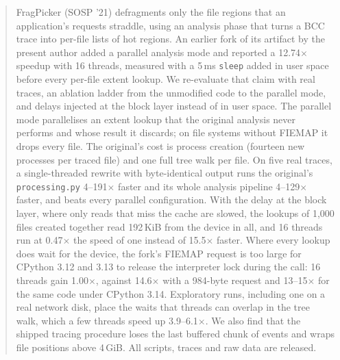\begin{abstract}
FragPicker (SOSP '21) defragments only the file regions that an application's requests
straddle, using an analysis phase that turns a BCC trace into per-file lists of hot
regions. An earlier fork of its artifact by the present author added a parallel
analysis mode and reported a 12.74$\times$ speedup with 16 threads, measured with a
5\,ms \texttt{sleep} added in user space before every per-file extent lookup. We
re-evaluate that claim with real traces, an ablation ladder from the unmodified code to
the parallel mode, and delays injected at the block layer instead of in user space.
The parallel mode parallelises an extent lookup that the original analysis never
performs and whose result it discards; on file systems without FIEMAP it drops every
file. The original's cost is process creation (fourteen new processes per traced file)
and one full tree walk per file. On five real traces, a single-threaded rewrite with
byte-identical output runs the original's \texttt{processing.py} 4--191$\times$ faster
and its whole analysis pipeline 4--129$\times$ faster, and beats every parallel
configuration. With the delay at the block layer, where only reads that miss
the cache are slowed, the lookups of 1{,}000 files created together read 192\,KiB from
the device in all, and 16 threads run at 0.47$\times$ the speed of one instead of
15.5$\times$ faster. Where every lookup does wait for the device, the fork's FIEMAP
request is too large for CPython 3.12 and 3.13 to release the interpreter lock during
the call: 16 threads gain 1.00$\times$, against 14.6$\times$ with a 984-byte request and
13--15$\times$ for the same code under CPython 3.14. Exploratory runs, including one on
a real network disk, place the waits that threads can overlap in the tree walk, which a
few threads speed up 3.9--6.1$\times$. We also find that the shipped tracing procedure
loses the last buffered chunk of events and wraps file positions above 4\,GiB. All
scripts, traces and raw data are released.
\end{abstract}
